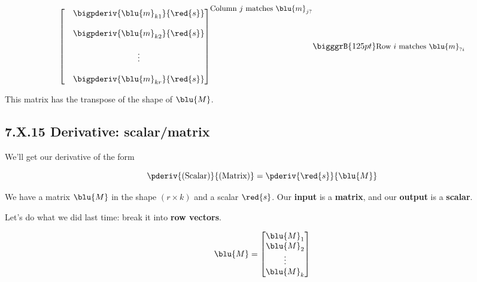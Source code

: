 \begin{definition}
\begin{equation*}
{\begin{bmatrix}
                        &
                        \begin{matrix}
                            \bigpderiv{ \blu{m}_{k1} }   { \red{s} }\\ 
                            \\
                            \bigpderiv{ \blu{m}_{k2} }   { \red{s} }\\ 
                            \\
                            \vdots \\ 
                            \\
                            \bigpderiv{ \blu{m}_{kr} }   { \red{s} }
                        \end{matrix}
                    \end{bmatrix}
                }^{ \text{\small Column $j$ matches $\blu{m}_{j?}$} }
                \bigggrB{125pt} \text{\small Row $i$ matches $\blu{m}_{?i}$} 
            \end{equation*}
            
            This matrix has the transpose of the shape of $\blu{M}$.
        \end{definition}
        
    \subsection*{7.X.15 \quad Derivative: scalar/matrix}
    
        We'll get our derivative of the form 
        
        \begin{equation}
            \pderiv{ \text{(Scalar)} } { \text{(Matrix)} } 
            =
            \pderiv{ \red{s} }{ \blu{M} } 
        \end{equation}
        
        We have a matrix $\blu{M}$ in the shape $(r \times k)$ and a scalar $\red{s}$. Our \textbf{input} is a \textbf{matrix}, and our \textbf{output} is a \textbf{scalar}.
        
        Let's do what we did last time: break it into \textbf{row vectors}.
        
        \begin{equation}
            \blu{M}
            =
            \begin{bmatrix}
                \blu{M}_1 \\ \blu{M}_2 \\ \vdots \\ \blu{M}_k
            \end{bmatrix}
        \end{equation}
        
